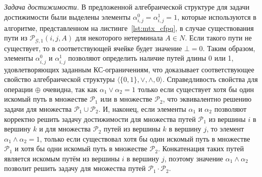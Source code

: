 \textit{Задача достижимости.} В предложенной алгебраической структуре для задачи достижимости были выделены элементы $\alpha^0_{i, j} = \alpha^1_{i, j} = 1$, которые используются в алгоритме, представленном на листинге~\ref{lst:mtx_cfpq}, в случае существования пути из $\mathcal{P}_{\mathcal{G}, 1}(i, j, A)$ для некоторого нетерминала $A \in N$. Если такого пути не существует, то в соответствующей ячейке будет значение $\bot = 0$. Таким образом, элементы $\alpha^0_{i, j}$ и $\alpha^1_{i, j}$ позволяют определить наличие путей длины 0 или 1, удовлетворяющих заданным КС-ограничениям, что доказывает соответствующее свойство алгебраической структуры $\langle \{0, 1\}, \vee, \wedge, 0\rangle$. Справедливость свойства для операции $\oplus$ очевидна, так как $\alpha_1 \vee \alpha_2 = 1$ только если существует хотя бы один искомый путь в множестве $\mathcal{P}_1$ или в множестве $\mathcal{P}_2$, что эквивалентно решению задачи для множества $\mathcal{P}_1 \cup \mathcal{P}_2$. И, наконец, если элементы $\alpha_1$ и $\alpha_2$ позволяют корректно решить задачу достижимости для множества путей $\mathcal{P}_1$ из вершины $i$ в вершину $k$ и для множества $\mathcal{P}_2$ путей из вершины $k$ в вершину $j$, то элемент $\alpha_1 \wedge \alpha_2 = 1$, только если существовал хотя бы один искомый путь в множестве $\mathcal{P}_1$ и хотя бы одни искомый путь в множестве $\mathcal{P}_2$. Конкатенация таких путей является искомым путём из вершины $i$ в вершину $j$, поэтому значение $\alpha_1 \wedge \alpha_2$ позволит решить задачу для множества путей $\mathcal{P}_1 \cdot \mathcal{P}_2$.

